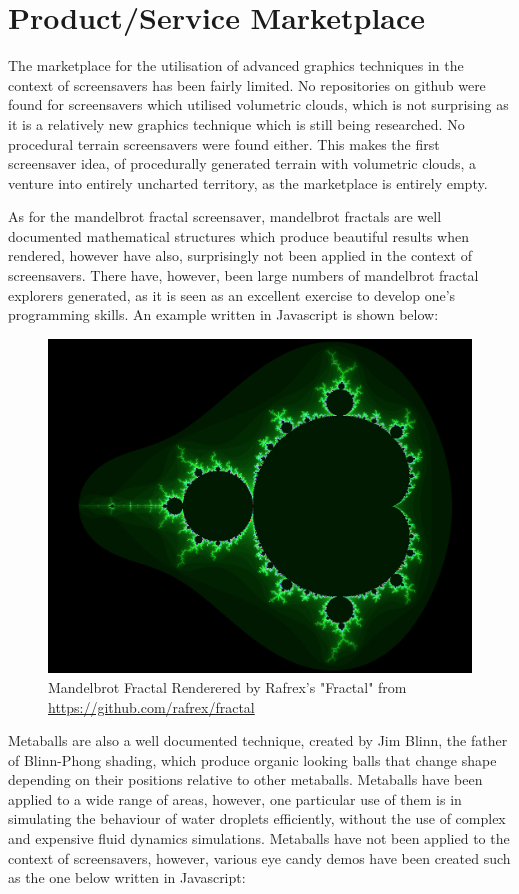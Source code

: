 \documentclass[10pt, openany]{book}
\begin{document}
\section{Product/Service Marketplace}

The marketplace for the utilisation of advanced graphics techniques in the context of screensavers has been fairly limited. No repositories on github were found for screensavers which utilised volumetric clouds, which is not surprising as it is a relatively new graphics technique which is still being researched. No procedural terrain screensavers were found either. This makes the first screensaver idea, of procedurally generated terrain with volumetric clouds, a venture into entirely uncharted territory, as the marketplace is entirely empty.

As for the mandelbrot fractal screensaver, mandelbrot fractals are well documented mathematical structures which produce beautiful results when rendered, however have also, surprisingly not been applied in the context of screensavers. There have, however, been large numbers of mandelbrot fractal explorers generated, as it is seen as an excellent exercise to develop one’s programming skills. An example written in Javascript is shown below:

\begin{figure}[H]
	\centering
	\includegraphics[width=.3\linewidth]{rafrex}
	\caption[Mandelbrot Fractal Rendered by Rafrex's "Fractal"]{Mandelbrot Fractal Renderered by Rafrex's "Fractal" from \url{https://github.com/rafrex/fractal}}
\end{figure}	

Metaballs are also a well documented technique, created by Jim Blinn, the father of Blinn-Phong shading, which produce organic looking balls that change shape depending on their positions relative to other metaballs. Metaballs have been applied to a wide range of areas, however, one particular use of them is in simulating the behaviour of water droplets efficiently, without the use of complex and expensive fluid dynamics simulations. Metaballs have not been applied to the context of screensavers, however, various eye candy demos have been created such as the one below written in Javascript:
\end{document}

